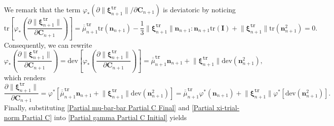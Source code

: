 \documentclass[preprint,11pt]{elsarticle}
\theoremstyle{definition}
\begin{document}
We remark that the term $\varphi_* \left( \partial \lVert \boldsymbol{\xi}_{n+1}^\texttt{tr} \rVert / \partial \mathbf{C}_{n+1} \right)$ is deviatoric by noticing
\begin{equation*}
    \text{tr} \left[ \varphi_* \left( \dfrac{\partial \lVert \boldsymbol{\xi}_{n+1}^\texttt{tr} \rVert}{\partial \mathbf{C}_{n+1}} \right) \right]
    = \overline{\overline{\mu}}_{n+1}^\texttt{tr} \text{tr}(\mathbf{n}_{n+1})
    - \dfrac{1}{3} \lVert \boldsymbol{\xi}_{n+1}^\texttt{tr} \rVert \mathbf{n}_{n+1} : \mathbf{n}_{n+1} \text{tr}(\mathbf{I})
    + \lVert \boldsymbol{\xi}_{n+1}^\texttt{tr} \rVert \text{tr} (\mathbf{n}_{n+1}^2) = 0.
\end{equation*}
Consequently, we can rewrite
\begin{equation*}
    \varphi_* \left( \dfrac{\partial \lVert \boldsymbol{\xi}_{n+1}^\texttt{tr} \rVert}{\partial \mathbf{C}_{n+1}} \right)
    = \text{dev} \left[ \varphi_* \left( \dfrac{\partial \lVert \boldsymbol{\xi}_{n+1}^\texttt{tr} \rVert}{\partial \mathbf{C}_{n+1}} \right) \right]
    = \overline{\overline{\mu}}_{n+1}^\texttt{tr} \mathbf{n}_{n+1} + \lVert \boldsymbol{\xi}_{n+1}^\texttt{tr} \rVert \text{dev} (\mathbf{n}_{n+1}^2),
\end{equation*}
which renders
\begin{equation} \label{Partial xi-trial-norm Partial C}
    \dfrac{\partial \lVert \boldsymbol{\xi}_{n+1}^\texttt{tr} \rVert}{\partial \mathbf{C}_{n+1}}
    = \varphi^* \left[ \overline{\overline{\mu}}_{n+1}^\texttt{tr} \mathbf{n}_{n+1} + \lVert \boldsymbol{\xi}_{n+1}^\texttt{tr} \rVert \text{dev} (\mathbf{n}_{n+1}^2) \right]
    = \overline{\overline{\mu}}_{n+1}^\texttt{tr} \varphi^*(\mathbf{n}_{n+1})
    + \lVert \boldsymbol{\xi}_{n+1}^\texttt{tr} \rVert \varphi^*\left[ \text{dev} (\mathbf{n}_{n+1}^2) \right].
\end{equation}
Finally, substituting \eqref{Partial mu-bar-bar Partial C Final} and \eqref{Partial xi-trial-norm Partial C} into \eqref{Partial gamma Partial C Initial} yields
\end{document}
